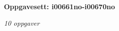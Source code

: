 \centerline{\bf Oppgavesett: i00661no-i00670no}
\vskip 10pt
\centerline{\it 10 oppgaver}\vskip 10pt
\vskip 10pt
